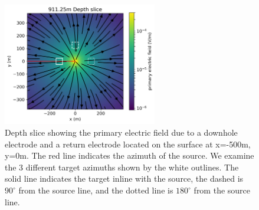 \begin{figure}
    \begin{center}
    \includegraphics[width=0.6\textwidth]{figures/dc_casing/primary_3D.png}
    \end{center}
\caption{
    Depth slice showing the primary electric field due to a downhole
    electrode and a return electrode located on the surface at x=-500m, y=0m. The red line indicates the
    azimuth of the source.
    We examine the 3 different target azimuths shown by the white outlines.
    The solid line indicates the target inline with the source,
    the dashed is $90^\circ$ from the source line, and the dotted line is $180^\circ$ from the source line.
}
\label{fig:primary_3D}
\end{figure}

